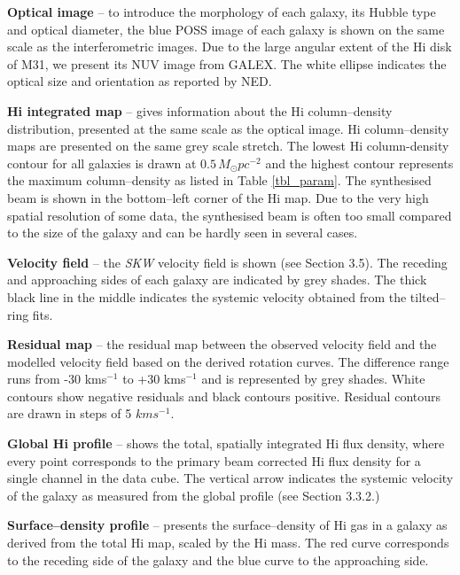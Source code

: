 \documentclass[usenatbib,useAMS]{mnras}
\begin{document}
\textbf{Optical image} -- to introduce the morphology of each galaxy,
its Hubble type and optical diameter, the blue POSS image of each galaxy
is shown on the same scale as the interferometric images.  Due to the
large angular extent of the H{\sc i} disk of M31, we present its NUV
image from GALEX.  The white ellipse indicates the optical size and
orientation as reported by NED. 

\textbf{H{\sc i} integrated map} -- gives information about the H{\sc i}
column--density distribution, presented at the same scale as the optical
image.  H{\sc i} column--density maps are presented on the same grey
scale stretch.  The lowest H{\sc i} column-density contour for all
galaxies is drawn at $0.5\,M_{\odot}pc^{-2}$ and the highest contour
represents the maximum column--density as listed in Table
\ref{tbl_param}. The synthesised beam is shown in the bottom--left
corner of the H{\sc i} map.  Due to the very high spatial resolution of
some data, the synthesised beam is often too small compared to the size
of the galaxy and can be hardly seen in several cases. 

\textbf{Velocity field} -- the {\it SKW} velocity field is shown (see
Section 3.5).  The receding and approaching sides of each galaxy are
indicated by grey shades.  The thick black line in the middle indicates
the systemic velocity obtained from the tilted--ring fits. 

\textbf{Residual map} -- the residual map between the observed velocity
field and the modelled velocity field based on the derived rotation
curves.  The difference range runs from -30 kms$^{-1}$ to +30 kms$^{-1}$
and is represented by grey shades.  White contours show negative
residuals and black contours positive.  Residual contours are drawn in
steps of 5 $kms^{-1}$. 

\textbf{Global H{\sc i} profile} -- shows the total, spatially
integrated H{\sc i} flux density, where every point corresponds to the
primary beam corrected H{\sc i} flux density for a single channel in the
data cube.  The vertical arrow indicates the systemic velocity of the
galaxy as measured from the global profile (see Section 3.3.2.)

\textbf{Surface--density profile} -- presents the surface--density of
H{\sc i} gas in a galaxy as derived from the total H{\sc i} map, scaled
by the H{\sc i} mass.  The red curve corresponds to the receding side of
the galaxy and the blue curve to the approaching side. 
\end{document}

